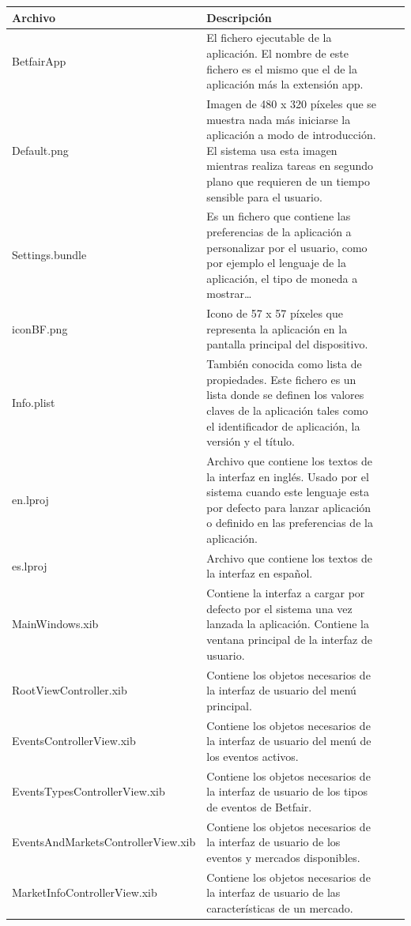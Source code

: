 \begin{tabularx}{15cm}{|lX|Xl|} 
\hline 
\rowcolor[gray]{0.9}Archivo & Descripción\\ 
\hline 
BetfairApp & El fichero ejecutable de la aplicación. El nombre de este fichero es el mismo que el de la aplicación más la extensión app.\\ 
\hline 
Default.png & Imagen de 480 x 320 píxeles que se muestra nada más iniciarse la aplicación  a modo de introducción. El sistema usa esta imagen mientras realiza tareas en segundo plano que requieren de un tiempo sensible para el usuario.\\
\hline
Settings.bundle & Es un fichero que contiene las preferencias de la aplicación a personalizar por el usuario, como por ejemplo el lenguaje de la aplicación, el tipo de moneda a mostrar\ldots \\
\hline
iconBF.png & Icono de 57 x 57 píxeles que representa la aplicación en la pantalla principal del dispositivo. \\
\hline
Info.plist & También conocida como lista de propiedades. Este fichero es un lista donde se definen los valores claves de la aplicación tales como el identificador de aplicación, la versión y el título.\\
\hline
en.lproj & Archivo que contiene los textos de la interfaz en inglés. Usado por el sistema cuando este lenguaje esta por defecto para lanzar aplicación o definido en las preferencias de la aplicación.\\
\hline
es.lproj &Archivo que contiene los textos de la interfaz en español.\\
\hline
MainWindows.xib & Contiene la interfaz a cargar por defecto por el sistema una vez lanzada la aplicación. Contiene la ventana principal de la interfaz de usuario. \\
\hline
RootViewController.xib & Contiene los objetos necesarios de la interfaz de usuario del menú principal. \\
\hline
EventsControllerView.xib &Contiene los objetos necesarios de la interfaz de usuario del menú de los eventos activos. \\
\hline
EventsTypesControllerView.xib & Contiene los objetos necesarios de la interfaz de usuario de los tipos de eventos de Betfair. \\
\hline
EventsAndMarketsControllerView.xib & Contiene los objetos necesarios de la interfaz de usuario de los eventos y mercados disponibles. \\
\hline
MarketInfoControllerView.xib & Contiene los objetos necesarios de la interfaz de usuario de las características de un mercado. \\

\end{tabularx}
